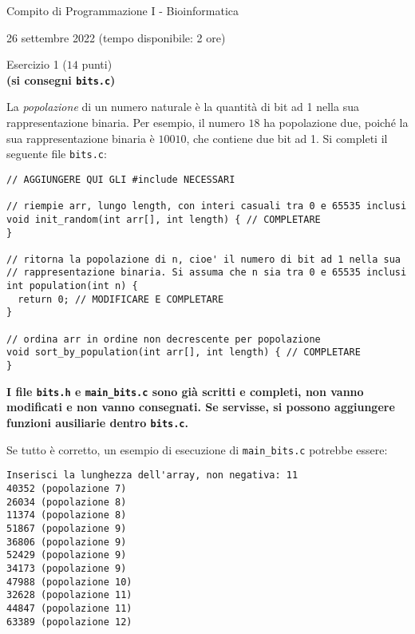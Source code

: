 \documentclass[12pt]{article}
\begin{document}
\begin{center}{\LARGE Compito di Programmazione I - Bioinformatica}\\
\begin{center}
  \large 26 settembre 2022 (tempo disponibile: 2 ore)
\end{center}
\end{center}

\vspace*{1ex}
\begin{center}{\Large Esercizio 1} ($14$ punti)\\
  \textbf{(si consegni \texttt{bits.c})}
\end{center}

La \emph{popolazione} di un numero naturale \`e la quantit\`a
di bit ad 1 nella sua rappresentazione binaria. Per esempio, il
numero $18$ ha popolazione due, poich\'e la sua rappresentazione
binaria \`e $10010$, che contiene due bit ad 1. Si completi il seguente file \texttt{bits.c}:

\begin{center}
  \begin{lstlisting}[language=myC]
// AGGIUNGERE QUI GLI #include NECESSARI

// riempie arr, lungo length, con interi casuali tra 0 e 65535 inclusi
void init_random(int arr[], int length) { // COMPLETARE
}

// ritorna la popolazione di n, cioe' il numero di bit ad 1 nella sua
// rappresentazione binaria. Si assuma che n sia tra 0 e 65535 inclusi
int population(int n) {
  return 0; // MODIFICARE E COMPLETARE
}

// ordina arr in ordine non decrescente per popolazione
void sort_by_population(int arr[], int length) { // COMPLETARE
}
  \end{lstlisting}
\end{center}

\begin{mdframed}[backgroundcolor=lightred] 
  \textbf{I file \texttt{bits.h} e \texttt{main\_bits.c} sono gi\`a scritti e completi, non vanno modificati e non vanno consegnati. Se servisse, si possono aggiungere funzioni ausiliarie dentro \texttt{bits.c}.}
\end{mdframed}

\vspace*{3ex}
Se tutto \`e corretto,
un esempio di esecuzione di \texttt{main\_bits.c} potrebbe essere:

\begin{mdframed}[backgroundcolor=verylightgray] 
\begin{verbatim}
Inserisci la lunghezza dell'array, non negativa: 11
40352 (popolazione 7)
26034 (popolazione 8)
11374 (popolazione 8)
51867 (popolazione 9)
36806 (popolazione 9)
52429 (popolazione 9)
34173 (popolazione 9)
47988 (popolazione 10)
32628 (popolazione 11)
44847 (popolazione 11)
63389 (popolazione 12)
\end{verbatim}
\end{mdframed}
\end{document}
